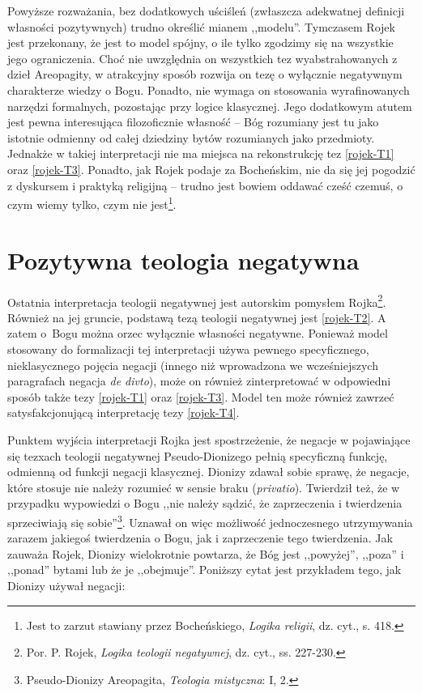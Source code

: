 Powyższe rozważania, bez dodatkowych uściśleń (zwłaszcza adekwatnej definicji własności pozytywnych)
trudno określić mianem ,,modelu''. Tymczasem Rojek jest przekonany, że jest to model spójny, o ile tylko zgodzimy się na
wszystkie jego ograniczenia. Choć nie
uwzględnia on wszystkich tez wyabstrahowanych z dzieł Areopagity, w
atrakcyjny sposób rozwija on tezę o wyłącznie negatywnym charakterze
wiedzy o Bogu. Ponadto, nie wymaga on stosowania wyrafinowanych
narzędzi formalnych, pozostając przy logice klasycznej. Jego dodatkowym
atutem jest pewna interesująca filozoficznie własność -- Bóg rozumiany
jest tu jako istotnie odmienny od całej dziedziny bytów rozumianych
jako przedmioty. Jednakże w takiej interpretacji nie ma miejsca na
rekonstrukcję tez \eqref{rojek-T1} oraz \eqref{rojek-T3}. Ponadto, jak Rojek podaje za Bocheńskim, nie da się jej pogodzić z
dyskursem i praktyką religijną -- trudno jest bowiem oddawać cześć
czemuś, o czym wiemy tylko, czym nie jest\footnote{Jest to zarzut
stawiany przez Bocheńskiego, \textit{Logika religii}, dz. cyt., s. 418.}.



\section{Pozytywna teologia negatywna}\label{roj-pozytywna}

Ostatnia interpretacja teologii negatywnej jest autorskim pomysłem
Rojka\footnote{Por. P. Rojek, \textit{Logika teologii negatywnej}, dz. cyt., ss. 227-230. }. Również na
jej gruncie, podstawą tezą teologii negatywnej jest \eqref{rojek-T2}. A zatem
o~Bogu można orzec wyłącznie własności negatywne. Ponieważ model
stosowany do formalizacji tej interpretacji używa pewnego
specyficznego, nieklasycznego pojęcia negacji (innego niż wprowadzona
we wcześniejszych paragrafach negacja \textit{de divto}), może on
również zinterpretować w odpowiedni sposób także tezy \eqref{rojek-T1} oraz \eqref{rojek-T3}.
Model ten może również zawrzeć satysfakcjonującą interpretację tezy
\eqref{rojek-T4}.

Punktem wyjścia interpretacji Rojka jest spostrzeżenie, że negacje w
pojawiające się tezxach teologii negatywnej Pseudo-Dionizego pełnią
specyficzną funkcję, odmienną od funkcji negacji klasycznej. Dionizy
zdawał sobie sprawę, że negacje, które stosuje nie należy rozumieć w
sensie braku (\textit{privatio}). Twierdził też, że w przypadku
wypowiedzi o Bogu ,,nie należy sądzić, że zaprzeczenia i twierdzenia
sprzeciwiają się sobie''\footnote{Pseudo-Dionizy Areopagita, \textit{Teologia mistyczna}:
I, 2. }. Uznawał on więc możliwość jednoczesnego utrzymywania
zarazem jakiegoś twierdzenia o Bogu, jak i zaprzeczenie tego twierdzenia. Jak
zauważa Rojek, Dionizy wielokrotnie powtarza, że Bóg jest ,,powyżej'',
,,poza'' i ,,ponad'' bytami lub że je ,,obejmuje''. Poniższy cytat jest
przykładem tego, jak Dionizy używał negacji:



